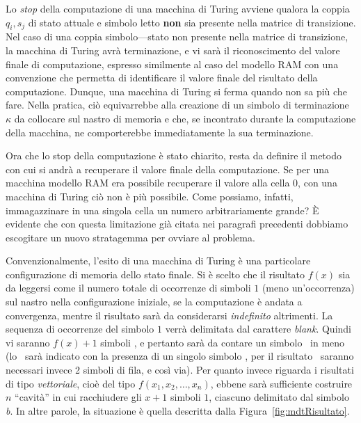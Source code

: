 \documentclass[10pt]{\classname}
\theoremstyle{newlinethm}
\theoremstyle{theorem}
\theoremstyle{definition}
\theoremstyle{definition}
\theoremstyle{definition}
\theoremstyle{definition}
\begin{document}
Lo \emph{stop} della computazione di una macchina di Turing avviene qualora la
coppia $q_i, s_j$ di stato attuale e simbolo letto \textbf{non} sia presente
nella matrice di transizione. Nel caso di una coppia simbolo---stato non
presente nella matrice di transizione, la macchina di Turing avrà terminazione,
e vi sarà il riconoscimento del valore finale di computazione, espresso
similmente al caso del modello RAM con una convenzione che permetta di
identificare il valore finale del risultato della computazione. Dunque, una
macchina di Turing si ferma quando non sa più che fare. Nella pratica, ciò
equivarrebbe alla creazione di un simbolo di terminazione $\kappa$ da collocare
sul nastro di memoria e che, se incontrato durante la computazione della
macchina, ne comporterebbe immediatamente la sua terminazione.

Ora che lo stop della computazione è stato chiarito, resta da definire il metodo
con cui si andrà a recuperare il valore finale della computazione. Se per una
macchina modello RAM era possibile recuperare il valore alla cella 0, con una
macchina di Turing ciò non è più possibile. Come possiamo, infatti,
immagazzinare in una singola cella un numero arbitrariamente grande? È evidente
che con questa limitazione già citata nei paragrafi precedenti dobbiamo
escogitare un nuovo stratagemma per ovviare al problema.

Convenzionalmente, l'esito di una macchina di Turing è una particolare
configurazione di memoria dello stato finale. Si è scelto che
il risultato $f(x)$ sia da leggersi come il numero totale di occorrenze di simboli $1$
(meno un'occorrenza) sul nastro nella configurazione iniziale, se la computazione è
andata a convergenza, mentre il risultato sarà da considerarsi \emph{indefinito}
altrimenti. La sequenza di occorrenze del simbolo $1$ verrà delimitata dal
carattere \emph{blank}. Quindi vi saranno $f(x) + 1$ simboli
\textquotesingle, e pertanto sarà da contare un simbolo
\textquotesingle\ in meno (lo
\textquotesingle\   sarà indicato con la presenza di un
singolo simbolo \textquotesingle, per il risultato
\textquotesingle\ saranno necessari invece 2 simboli
\textquotesingle di fila, e così via). Per quanto invece
riguarda i risultati di tipo \emph{vettoriale}, cioè del tipo
$f(x_1,x_2,\dots,x_n)$, ebbene sarà sufficiente costruire $n$ ``cavità'' in
cui racchiudere gli $x+1$ simboli $1$, ciascuno delimitato dal simbolo
\emph{b}. In altre parole, la situazione è quella descritta dalla
Figura~\ref{fig:mdtRisultato}.
\end{document}
